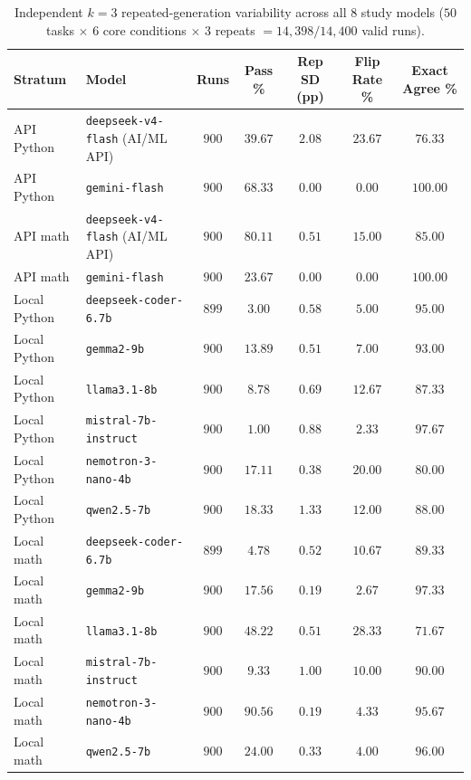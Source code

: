 \documentclass[a4paper,fleqn]{cas-sc}
\begin{document}
\begin{table}[htbp]
\centering
\caption{Independent $k = 3$ repeated-generation variability across all 8 study models ($50$ tasks $\times$ $6$ core conditions $\times$ $3$ repeats $= 14{,}398 / 14{,}400$ valid runs).}\label{tab:k3-repeated-variability}
\footnotesize
\setlength{\tabcolsep}{4pt}
\begin{tabular}{@{}llccccc@{}}
\toprule
\textbf{Stratum} & \textbf{Model} & \textbf{Runs} & \textbf{Pass \%} & \textbf{Rep SD (pp)} & \textbf{Flip Rate \%} & \textbf{Exact Agree \%} \\
\midrule
API Python & \texttt{deepseek-v4-flash} (AI/ML API) & $900$ & $39.67$ & $2.08$ & $23.67$ & $76.33$ \\
API Python & \texttt{gemini-flash} & $900$ & $68.33$ & $0.00$ & $0.00$ & $100.00$ \\
API math & \texttt{deepseek-v4-flash} (AI/ML API) & $900$ & $80.11$ & $0.51$ & $15.00$ & $85.00$ \\
API math & \texttt{gemini-flash} & $900$ & $23.67$ & $0.00$ & $0.00$ & $100.00$ \\
\midrule
Local Python & \texttt{deepseek-coder-6.7b} & $899$ & $3.00$ & $0.58$ & $5.00$ & $95.00$ \\
Local Python & \texttt{gemma2-9b} & $900$ & $13.89$ & $0.51$ & $7.00$ & $93.00$ \\
Local Python & \texttt{llama3.1-8b} & $900$ & $8.78$ & $0.69$ & $12.67$ & $87.33$ \\
Local Python & \texttt{mistral-7b-instruct} & $900$ & $1.00$ & $0.88$ & $2.33$ & $97.67$ \\
Local Python & \texttt{nemotron-3-nano-4b} & $900$ & $17.11$ & $0.38$ & $20.00$ & $80.00$ \\
Local Python & \texttt{qwen2.5-7b} & $900$ & $18.33$ & $1.33$ & $12.00$ & $88.00$ \\
\midrule
Local math & \texttt{deepseek-coder-6.7b} & $899$ & $4.78$ & $0.52$ & $10.67$ & $89.33$ \\
Local math & \texttt{gemma2-9b} & $900$ & $17.56$ & $0.19$ & $2.67$ & $97.33$ \\
Local math & \texttt{llama3.1-8b} & $900$ & $48.22$ & $0.51$ & $28.33$ & $71.67$ \\
Local math & \texttt{mistral-7b-instruct} & $900$ & $9.33$ & $1.00$ & $10.00$ & $90.00$ \\
Local math & \texttt{nemotron-3-nano-4b} & $900$ & $90.56$ & $0.19$ & $4.33$ & $95.67$ \\
Local math & \texttt{qwen2.5-7b} & $900$ & $24.00$ & $0.33$ & $4.00$ & $96.00$ \\
\bottomrule
\end{tabular}
\end{table}
\end{document}
